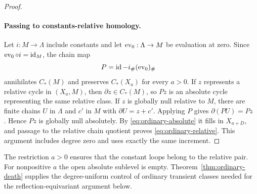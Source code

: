 \begin{proof}
\paragraph{Passing to constants-relative homology.}
Let $i:M\to\Lambda$ include constants and let
$\operatorname{ev}_0:\Lambda\to M$ be evaluation at zero.  Since
$\operatorname{ev}_0\circ i=\operatorname{id}_M$, the chain map
\[
 P=\operatorname{id}-i_\#(\operatorname{ev}_0)_\#
\]
annihilates $C_*(M)$ and preserves $C_*(X_a)$ for every $a>0$.
If $z$ represents a relative cycle in $(X_a,M)$, then
$\partial z\in C_*(M)$, so $Pz$ is an absolute cycle representing
the same relative class.  If $z$ is globally null relative to $M$,
there are finite chains $U$ in $\Lambda$ and $c'$ in $M$ with
$\partial U=z+c'$.  Applying $P$ gives $\partial(PU)=Pz$.
Hence $Pz$ is globally null absolutely.  By
\eqref{eq:ordinary-absolute} it fills in $X_{a+D}$, and passage to
the relative chain quotient proves \eqref{eq:ordinary-relative}.
This argument includes degree zero and uses exactly the same increment.
\end{proof}

The restriction $a>0$ ensures that the constant loops belong to the
relative pair.  For nonpositive $a$ the open absolute sublevel is empty.
Theorem~\ref{thm:ordinary-death} supplies the degree-uniform control of
ordinary transient classes needed for the reflection-equivariant argument
below.
